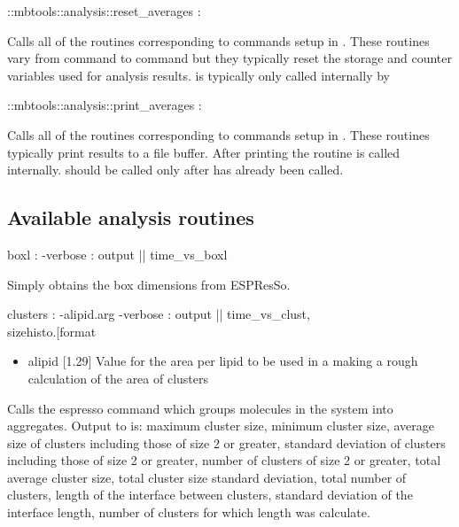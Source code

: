 \begin{code}
   ::mbtools::analysis::reset_averages  :
\end{code}
Calls all of the  routines corresponding to commands setup in . These routines vary from command to command but they typically reset the storage and counter variables used for analysis results.
 is typically only called internally by 

\begin{code}
 ::mbtools::analysis::print_averages :
\end{code}
Calls all of the  routines corresponding to commands setup in . These routines typically print results to a file buffer. After printing the  routine is called internally.  should be called only after  has already been called. 

\subsection{Available analysis routines}

\begin{code}
   boxl  :  -verbose  : output ||  time_vs_boxl
\end{code}
Simply obtains the box dimensions from ESPResSo.

\begin{code}
  clusters : -alipid.arg -verbose : output || time_vs_clust, \\
             sizehisto.[format %
\end{code}
\begin{itemize}
   \item alipid [1.29] Value for the area per lipid to be used in a making a rough calculation of the area of clusters
\end{itemize}
Calls the espresso command  which groups molecules in the system into aggregates. Output to  is: maximum cluster size, minimum cluster size, average size of clusters including those of size 2 or greater, standard deviation of clusters including those of size 2 or greater, number of clusters of size 2 or greater, total average cluster size, total cluster size standard deviation, total number of clusters, length of the interface between clusters, standard deviation of the interface length, number of clusters for which length was calculate.

